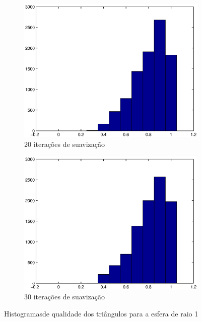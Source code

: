 \documentclass[11pt]{article}
\begin{document}
\begin{figure}
\begin{subfigure}[b]{0.45\textwidth}
				\centering
				\includegraphics[width=\textwidth]{figures/20iter_sphere}
				\caption{20 iterações de suavização}				
			\end{subfigure}
			\begin{subfigure}[b]{0.45\textwidth}
				\centering
				\includegraphics[width=\textwidth]{figures/30iter_sphere}
				\caption{30 iterações de suavização}				
			\end{subfigure}
			\caption{Histogramasde qualidade dos triângulos para a esfera de raio 1}
			\label{fig:hist:sphere}
		\end{figure}
\end{document}
